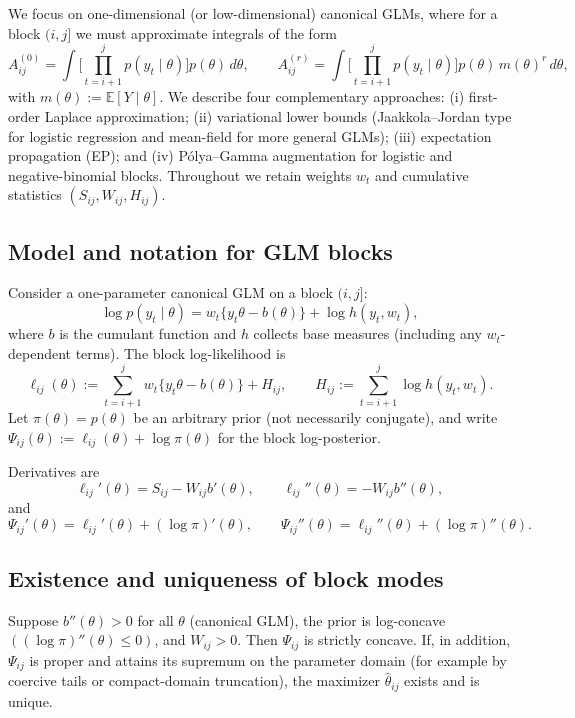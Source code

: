 We focus on one-dimensional (or low-dimensional) canonical GLMs, where for a block $(i,j]$ we
must approximate integrals of the form
\[
A^{(0)}_{ij}
 = \int \Big[\prod_{t=i+1}^j p(y_t\mid\theta)\Big] p(\theta)\,d\theta,\qquad
A^{(r)}_{ij}
 = \int \Big[\prod_{t=i+1}^j p(y_t\mid\theta)\Big] p(\theta)\,m(\theta)^r\,d\theta,
\]
with $m(\theta):=\mathbb{E}[Y\mid\theta]$. We describe four complementary approaches:
(i) first-order Laplace approximation; (ii) variational lower bounds (Jaakkola–Jordan \citep{jaakkola2000logisticvb} type
for logistic regression and mean-field for more general GLMs); (iii) expectation propagation
(EP); and (iv) P\'olya--Gamma augmentation for logistic and negative-binomial blocks. Throughout
we retain weights $w_t$ and cumulative statistics $(S_{ij},W_{ij},H_{ij})$.

\subsection{Model and notation for GLM blocks}

Consider a one-parameter canonical GLM on a block $(i,j]$:
\[
\log p(y_t\mid\theta)
 = w_t\big\{ y_t\theta - b(\theta)\big\} + \log h(y_t,w_t),
\]
where $b$ is the cumulant function and $h$ collects base measures (including any $w_t$-dependent
terms). The block log-likelihood is
\[
\ell_{ij}(\theta)
 := \sum_{t=i+1}^j w_t\{y_t\theta - b(\theta)\} + H_{ij},
\qquad
H_{ij}:=\sum_{t=i+1}^j \log h(y_t,w_t).
\]
Let $\pi(\theta)=p(\theta)$ be an arbitrary prior (not necessarily conjugate), and write
$\Psi_{ij}(\theta):=\ell_{ij}(\theta)+\log\pi(\theta)$ for the block log-posterior.

Derivatives are
\[
\ell_{ij}'(\theta) = S_{ij} - W_{ij} b'(\theta),\qquad
\ell_{ij}''(\theta) = -W_{ij} b''(\theta),
\]
and
\[
\Psi_{ij}'(\theta) = \ell_{ij}'(\theta) + (\log\pi)'(\theta),\qquad
\Psi_{ij}''(\theta) = \ell_{ij}''(\theta) + (\log\pi)''(\theta).
\]

\subsection{Existence and uniqueness of block modes}

\begin{lemma}
\label{lem:concave-unique}
Suppose $b''(\theta)>0$ for all $\theta$ (canonical GLM), the prior is log-concave
$((\log\pi)''(\theta)\le 0)$, and $W_{ij}>0$. Then $\Psi_{ij}$ is strictly concave. If, in
addition, $\Psi_{ij}$ is proper and attains its supremum on the parameter domain (for example by
coercive tails or compact-domain truncation), the maximizer $\hat\theta_{ij}$ exists and is unique.
\end{lemma}

